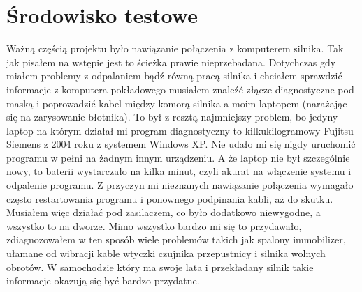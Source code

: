 \documentclass[declaration,shortabstract, inz]{iithesis}
\begin{document}
\section{Środowisko testowe} %
    Ważną częścią projektu było nawiązanie połączenia z komputerem silnika. Tak jak pisałem na wstępie jest to ścieżka prawie nieprzebadana. Dotychczas gdy miałem problemy z odpalaniem bądź równą pracą silnika i chciałem sprawdzić informacje z komputera pokładowego musiałem znaleźć złącze diagnostyczne pod maską i poprowadzić kabel między komorą silnika a moim laptopem (narażając się na zarysowanie błotnika). To był z resztą najmniejszy problem, bo jedyny laptop na którym działał mi program diagnostyczny to kilkukilogramowy Fujitsu-Siemens z 2004 roku z systemem Windows XP. Nie udało mi się nigdy uruchomić programu w pełni na żadnym innym urządzeniu. A że laptop nie był szczególnie nowy, to baterii wystarczało na kilka minut, czyli akurat na włączenie systemu i odpalenie programu. Z przyczyn mi nieznanych nawiązanie połączenia wymagało często restartowania programu i ponownego podpinania kabli, aż do skutku. Musiałem więc działać pod zasilaczem, co było dodatkowo niewygodne, a wszystko to na dworze. Mimo wszystko bardzo mi się to przydawało, zdiagnozowałem w ten sposób wiele problemów takich jak spalony immobilizer, ułamane od wibracji kable wtyczki czujnika przepustnicy i silnika wolnych obrotów. W samochodzie który ma swoje lata i przekładany silnik takie informacje okazują się być bardzo przydatne.
    
\end{document}
